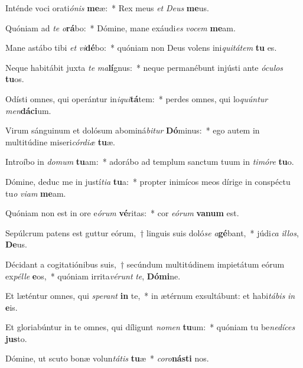 \item Inténde voci orati\textit{ó}\textit{nis} \textbf{me}æ:~* Rex meus \textit{et} \textit{De}\textit{us} \textbf{me}us.
\item Quóniam ad \textit{te} \textit{o}\textbf{rá}bo:~* Dómine, mane exáudi\textit{es} \textit{vo}\textit{cem} \textbf{me}am.
\item Mane astábo tibi \textit{et} \textit{vi}\textbf{dé}bo:~* quóniam non Deus volens ini\textit{qui}\textit{tá}\textit{tem} \textbf{tu} es.
\item Neque habitábit juxta \textit{te} \textit{ma}\textbf{lí}gnus:~* neque permanébunt injústi ante \textit{ó}\textit{cu}\textit{los} \textbf{tu}os.
\item Odísti omnes, qui operántur in\textit{i}\textit{qui}\textbf{tá}tem:~* perdes omnes, qui lo\textit{quún}\textit{tur} \textit{men}\textbf{dá}\textbf{ci}um.
\item Virum sánguinum et dolósum abominá\textit{bi}\textit{tur} \textbf{Dó}minus:~* ego autem in multitúdine miseri\textit{cór}\textit{di}\textit{æ} \textbf{tu}æ.
\item Introíbo in \textit{do}\textit{mum} \textbf{tu}am:~* adorábo ad templum sanctum tuum in \textit{ti}\textit{mó}\textit{re} \textbf{tu}o.
\item Dómine, deduc me in justí\textit{ti}\textit{a} \textbf{tu}a:~* propter inimícos meos dírige in conspéctu tu\textit{o} \textit{vi}\textit{am} \textbf{me}am.
\item Quóniam non est in ore e\textit{ó}\textit{rum} \textbf{vé}ritas:~* cor \textit{e}\textit{ó}\textit{rum} \textbf{va}\textbf{num} est.
\item Sepúlcrum patens est guttur eórum,~† linguis suis doló\textit{se} \textit{a}\textbf{gé}bant,~* júdi\textit{ca} \textit{il}\textit{los}, \textbf{De}us.
\item Décidant a cogitatiónibus suis,~† secúndum multitúdinem impietátum eórum ex\textit{pél}\textit{le} \textbf{e}os,~* quóniam irrita\textit{vé}\textit{runt} \textit{te}, \textbf{Dó}\textbf{mi}ne.
\item Et læténtur omnes, qui \textit{spe}\textit{rant} \textbf{in} te,~* in ætérnum exsultábunt: et habi\textit{tá}\textit{bis} \textit{in} \textbf{e}is.
\item Et gloriabúntur in te omnes, qui díligunt \textit{no}\textit{men} \textbf{tu}um:~* quóniam tu be\textit{ne}\textit{dí}\textit{ces} \textbf{jus}to.
\item Dómine, ut scuto bonæ volun\textit{tá}\textit{tis} \textbf{tu}æ~* \textit{co}\textit{ro}\textbf{nás}\textbf{ti} nos.
